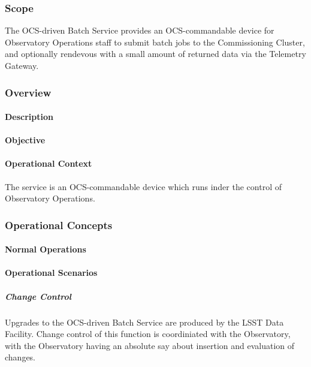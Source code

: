 \subsubsection{Scope}

The OCS-driven Batch Service provides an OCS-commandable device for Observatory
Operations staff to submit batch jobs to the Commissioning Cluster, and optionally rendevous
with a small amount of returned data via the Telemetry Gateway.

\subsubsection{Overview}

\paragraph{Description}


\paragraph{Objective}


\paragraph{Operational Context}

The service is an OCS-commandable device which runs inder the control of
Observatory  Operations.

\subsubsection{Operational Concepts}

\paragraph{Normal Operations}

\paragraph{Operational Scenarios}

\subparagraph{Change Control}

Upgrades to the OCS-driven Batch Service are produced by the LSST Data Facility. Change control
of this function is coordiniated with the Observatory, with the Observatory having an absolute say
about insertion and evaluation of changes.
